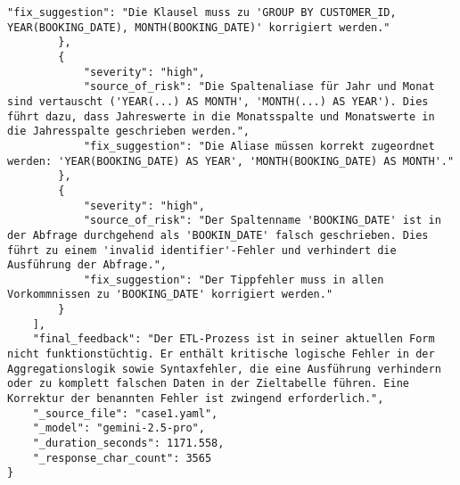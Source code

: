 \begin{lstlisting}[caption={Ausgabe: GEMINI 2.5 Pro Anwendungsfall 1 Hauptdurchlauf},label={gemini_case1_prompt1}]
            "fix_suggestion": "Die Klausel muss zu 'GROUP BY CUSTOMER_ID, YEAR(BOOKING_DATE), MONTH(BOOKING_DATE)' korrigiert werden."
        },
        {
            "severity": "high",
            "source_of_risk": "Die Spaltenaliase für Jahr und Monat sind vertauscht ('YEAR(...) AS MONTH', 'MONTH(...) AS YEAR'). Dies führt dazu, dass Jahreswerte in die Monatsspalte und Monatswerte in die Jahresspalte geschrieben werden.",
            "fix_suggestion": "Die Aliase müssen korrekt zugeordnet werden: 'YEAR(BOOKING_DATE) AS YEAR', 'MONTH(BOOKING_DATE) AS MONTH'."
        },
        {
            "severity": "high",
            "source_of_risk": "Der Spaltenname 'BOOKING_DATE' ist in der Abfrage durchgehend als 'BOOKIN_DATE' falsch geschrieben. Dies führt zu einem 'invalid identifier'-Fehler und verhindert die Ausführung der Abfrage.",
            "fix_suggestion": "Der Tippfehler muss in allen Vorkommnissen zu 'BOOKING_DATE' korrigiert werden."
        }
    ],
    "final_feedback": "Der ETL-Prozess ist in seiner aktuellen Form nicht funktionstüchtig. Er enthält kritische logische Fehler in der Aggregationslogik sowie Syntaxfehler, die eine Ausführung verhindern oder zu komplett falschen Daten in der Zieltabelle führen. Eine Korrektur der benannten Fehler ist zwingend erforderlich.",
    "_source_file": "case1.yaml",
    "_model": "gemini-2.5-pro",
    "_duration_seconds": 1171.558,
    "_response_char_count": 3565
}
\end{lstlisting}

